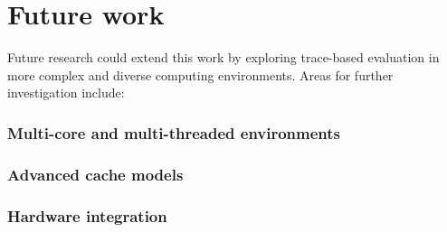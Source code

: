 \section{Future work}

Future research could extend this work by exploring trace-based evaluation in more complex and diverse computing environments. Areas for further investigation include:

\subsubsection*{Multi-core and multi-threaded environments}

\subsubsection*{Advanced cache models}

\subsubsection*{Hardware integration}
